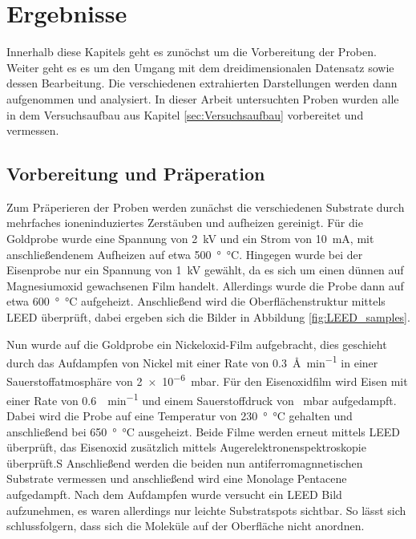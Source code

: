 \chapter{Ergebnisse}
    Innerhalb diese Kapitels geht es zunöchst um die Vorbereitung der Proben.
    Weiter geht es es um den Umgang mit dem dreidimensionalen Datensatz sowie dessen Bearbeitung.
    Die verschiedenen extrahierten Darstellungen werden dann aufgenommen und analysiert.
    In dieser Arbeit untersuchten Proben wurden alle in dem Versuchsaufbau aus Kapitel \ref{sec:Versuchsaufbau} vorbereitet und vermessen.

    \section{Vorbereitung und Präperation}
    \label{sec:Praep}
        Zum Präperieren der Proben werden zunächst die verschiedenen Substrate durch mehrfaches ioneninduziertes Zerstäuben und aufheizen gereinigt.
        Für die Goldprobe wurde eine Spannung von \SI{2}{\kilo\volt} und ein Strom von \SI{10}{\milli\ampere}, mit anschließendenem Aufheizen auf etwa \SI{500}{\degree\celsius}.
        Hingegen wurde bei der Eisenprobe nur ein Spannung von \SI{1}{\kilo\volt} gewählt, da es sich um einen dünnen auf Magnesiumoxid gewachsenen Film handelt.
        Allerdings wurde die Probe dann auf etwa \SI{600}{\degree\celsius} aufgeheizt.
        Anschließend wird die Oberflächenstruktur mittels LEED überprüft, dabei ergeben sich die Bilder in Abbildung \ref{fig:LEED_samples}.

        Nun wurde auf die Goldprobe ein Nickeloxid-Film aufgebracht, dies geschieht durch das Aufdampfen von Nickel mit einer Rate von \SI{0.3}{\angstrom\per\minute} in einer Sauerstoffatmosphäre von \SI{2e-6}{\milli\bar}.
        Für den Eisenoxidfilm wird Eisen mit einer Rate von \SI{0.6}{\ML\per\minute} und einem Sauerstoffdruck von \SI{}{\milli\bar} aufgedampft.
        Dabei wird die Probe auf eine Temperatur von \SI{230}{\degree\celsius} gehalten und anschließend bei \SI{650}{\degree\celsius} ausgeheizt.
        Beide Filme werden erneut mittels LEED überprüft, das Eisenoxid zusätzlich mittels Augerelektronenspektroskopie überprüft.S
        Anschließend werden die beiden nun antiferromagnnetischen Substrate vermessen und anschließend wird eine Monolage Pentacene aufgedampft.
        Nach dem Aufdampfen wurde versucht ein LEED Bild aufzunehmen, es waren allerdings nur leichte Substratspots sichtbar.
        So lässt sich schlussfolgern, dass sich die Moleküle auf der Oberfläche nicht anordnen.
        

